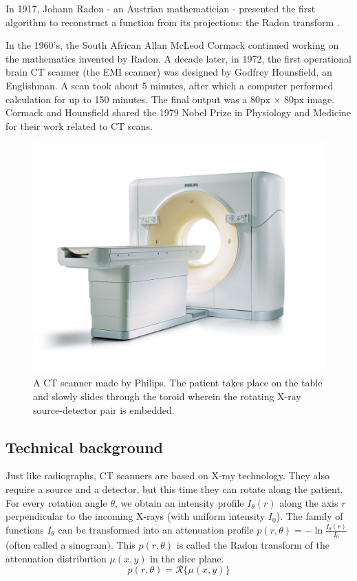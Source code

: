 In 1917, Johann Radon - an Austrian mathematician - presented the first
algorithm to reconstruct a function from its projections: the Radon transform
\cite{radon}.

In the 1960's, the South African Allan McLeod Cormack continued working on the
mathematics invented by Radon. A decade later, in 1972, the first operational
brain CT scanner (the EMI scanner) was designed by Godfrey Hounsfield, an
Englishman. A scan took about 5 minutes, after which a computer performed
calculation for up to 150 minutes. The final output was a 80px $\times$ 80px
image. Cormack and Hounsfield shared the 1979 Nobel Prize in Physiology and
Medicine for their work related to CT scans.


\begin{figure}[ht]
\begin{center}
  \includegraphics[width=\linewidth]{img/ctscanner.jpg}
  \caption{A CT scanner made by Philips. The patient takes place on the table
  and slowly slides through the toroid wherein the rotating X-ray
  source-detector pair is embedded.}
  \label{fig:ctscanner}
\end{center}
\end{figure}

\subsection{Technical background}
Just like radiographs, CT scanners are based on X-ray technology. They also
require a source and a detector, but this time they can rotate along the
patient. For every rotation angle $\theta$, we obtain an intensity profile
$I_\theta(r)$ along the axis $r$ perpendicular to the incoming X-rays (with
uniform intensity $I_0$). The family of functions $I_\theta$ can be transformed
into an attenuation profile $p(r, \theta) = -\ln \tfrac{I_\theta(r)}{I_0}$
(often called a sinogram). This $p(r, \theta)$ is called the Radon transform of
the attenuation distribution $\mu(x,y)$ in the slice plane.
\begin{equation}
	p(r, \theta) = \mathscr{R}\{ \mu(x,y) \}
\end{equation}

